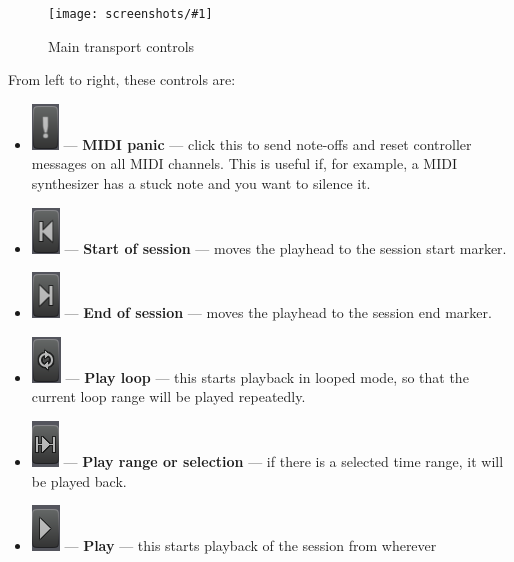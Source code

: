 \documentclass[10pt,a4paper]{book}
\newcommand{\screenshot}[3]{%
\begin{figure}[ht]%
\begin{center}
\texttt{[image: screenshots/\#1]}
\end{center}
\caption{#2}
\label{#3}
\end{figure}}
\begin{document}
{\screenshot{transport-controls.png}{Main transport controls}{fig:transport-controls2}

From left to right, these controls are:
\begin{itemize}
\item \includegraphics[scale=0.5]{screenshots/midi-panic.png} ---
  \textbf{MIDI panic} --- click this to send note-offs and reset
  controller messages on all MIDI channels.  This is useful if, for
  example, a MIDI synthesizer has a stuck note and you want to silence
  it.
\item \includegraphics[scale=0.5]{screenshots/go-to-start.png} ---
  \textbf{Start of session} --- moves the playhead to the session
  start marker.
\item \includegraphics[scale=0.5]{screenshots/go-to-end.png} ---
  \textbf{End of session} --- moves the playhead to the session
  end marker.
\item \includegraphics[scale=0.5]{screenshots/loop.png} ---
  \textbf{Play loop} --- this starts playback in looped mode, so that
  the current loop range will be played repeatedly.
\item \includegraphics[scale=0.5]{screenshots/play-range.png} ---
  \textbf{Play range or selection} --- if there is a selected time
  range, it will be played back. 
\item \includegraphics[scale=0.5]{screenshots/play.png} ---
  \textbf{Play} --- this starts playback of the session from wherever

\end{itemize}}
\end{document}
